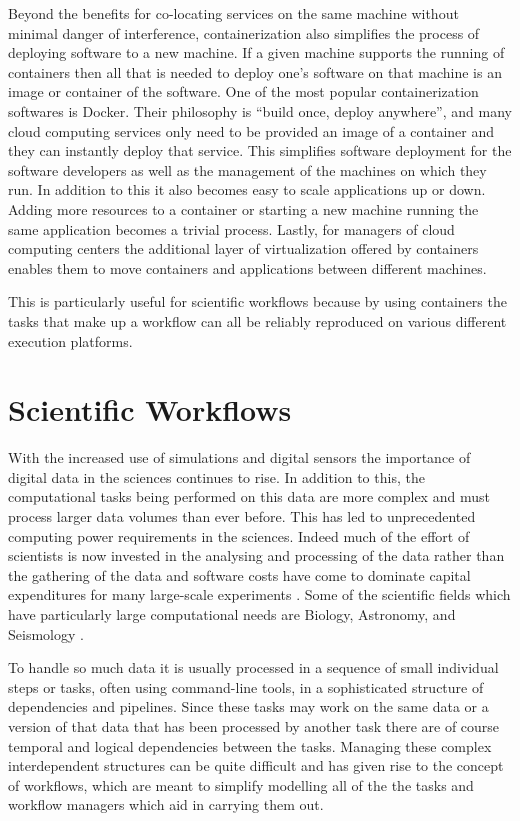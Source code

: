 Beyond the benefits for co-locating services on the same machine without minimal danger of interference, containerization also simplifies the process of deploying software to a new machine. If a given machine supports the running of containers then all that is needed to deploy one's software on that machine is an image or container of the software. One of the most popular containerization softwares is Docker. Their philosophy is ``build once, deploy anywhere'', and many cloud computing services only need to be provided an image of a container and they can instantly deploy that service. This simplifies software deployment for the software developers as well as the management of the machines on which they run. In addition to this it also becomes easy to scale applications up or down. Adding more resources to a container or starting a new machine running the same application becomes a trivial process. Lastly, for managers of cloud computing centers the additional layer of virtualization offered by containers enables them to move containers and applications between different machines. 

This is particularly useful for scientific workflows because by using containers the tasks that make up a workflow can all be reliably reproduced on various different execution platforms. 

\section{Scientific Workflows}
\label{sec:workflows}

With the increased use of simulations and digital sensors the importance of digital data in the sciences continues to rise\cite{ScientificWorkflows}. In addition to this, the computational tasks being performed on this data are more complex and must process larger data volumes than ever before. This has led to unprecedented computing power requirements in the sciences. Indeed much of the effort of scientists is now invested in the analysing and processing of the data rather than the gathering of the data and software costs have come to dominate capital expenditures for many large-scale experiments \cite{Gray}. Some of the scientific fields which have particularly large computational needs are Biology, Astronomy, and Seismology \cite{ScientificWorkflows}. 

To handle so much data it is usually processed in a sequence of small individual steps or tasks, often using command-line tools, in a sophisticated structure of dependencies and pipelines. Since these tasks may work on the same data or a version of that data that has been processed by another task there are of course temporal and logical dependencies between the tasks. Managing these complex interdependent structures can be quite difficult and has given rise to the concept of workflows, which are meant to simplify modelling all of the the tasks and workflow managers which aid in carrying them out. 

